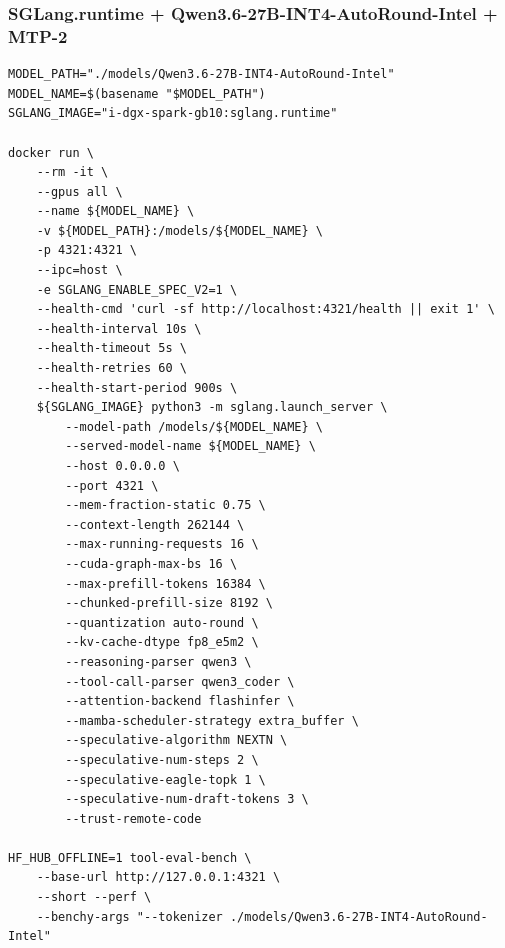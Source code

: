 \documentclass{article}
\begin{document}
\subsubsection{SGLang.runtime + Qwen3.6-27B-INT4-AutoRound-Intel + MTP-2}
\begin{lstlisting}
MODEL_PATH="./models/Qwen3.6-27B-INT4-AutoRound-Intel"
MODEL_NAME=$(basename "$MODEL_PATH")
SGLANG_IMAGE="i-dgx-spark-gb10:sglang.runtime"

docker run \
    --rm -it \
    --gpus all \
    --name ${MODEL_NAME} \
    -v ${MODEL_PATH}:/models/${MODEL_NAME} \
    -p 4321:4321 \
    --ipc=host \
    -e SGLANG_ENABLE_SPEC_V2=1 \
    --health-cmd 'curl -sf http://localhost:4321/health || exit 1' \
    --health-interval 10s \
    --health-timeout 5s \
    --health-retries 60 \
    --health-start-period 900s \
    ${SGLANG_IMAGE} python3 -m sglang.launch_server \
        --model-path /models/${MODEL_NAME} \
        --served-model-name ${MODEL_NAME} \
        --host 0.0.0.0 \
        --port 4321 \
        --mem-fraction-static 0.75 \
        --context-length 262144 \
        --max-running-requests 16 \
        --cuda-graph-max-bs 16 \
        --max-prefill-tokens 16384 \
        --chunked-prefill-size 8192 \
        --quantization auto-round \
        --kv-cache-dtype fp8_e5m2 \
        --reasoning-parser qwen3 \
        --tool-call-parser qwen3_coder \
        --attention-backend flashinfer \
        --mamba-scheduler-strategy extra_buffer \
        --speculative-algorithm NEXTN \
        --speculative-num-steps 2 \
        --speculative-eagle-topk 1 \
        --speculative-num-draft-tokens 3 \
        --trust-remote-code

HF_HUB_OFFLINE=1 tool-eval-bench \
    --base-url http://127.0.0.1:4321 \
    --short --perf \
    --benchy-args "--tokenizer ./models/Qwen3.6-27B-INT4-AutoRound-Intel"
\end{lstlisting}
\end{document}
